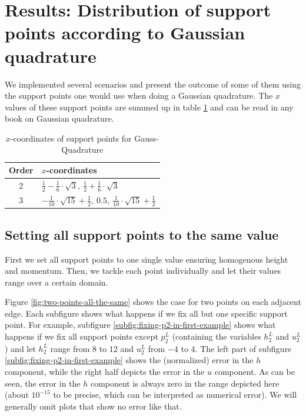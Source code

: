 \documentclass{article}
\begin{document}
\section{Results: Distribution of support points according to Gaussian quadrature}
\label{sec:results}

We implemented several scenarios and present the outcome of some of them using the support points one would use when doing a Gaussian quadrature. The $x$ values of these support points are summed up in table \ref{tab:x-coordinates-gauss-quadrature} and can be read in any book on Gaussian quadrature.

\begin{table}[ht]
  \renewcommand\arraystretch{1.5}
  \centering
  \begin{tabular}[ht]{cl}
    Order & $x$-coordinates \\
    \hline
    2 & $\frac{1}{2}-\frac{1}{6}\cdot \sqrt{3},\  \frac{1}{2}+\frac{1}{6}\cdot \sqrt{3}$ \\
    3 & $-\frac{1}{10}\cdot \sqrt{15}+\frac{1}{2} ,\  0.5,\  \frac{1}{10}\cdot \sqrt{15}+\frac{1}{2}$ \\
    \hline 
  \end{tabular}
  \caption{$x$-coordinates of support points for Gauss-Quadrature}
  \label{tab:x-coordinates-gauss-quadrature}
\end{table}

\subsection{Setting all support points to the same value}
\label{sec:setting-all-support-points-to-the-same-value}

First we set all support points to one single value ensuring homogenous height and momentum. Then, we tackle each point individually and let their values range over a certain domain.



Figure \ref{fig:two-points-all-the-same} shows the case for two points on each adjacent edge. Each subfigure shows what happens if we fix all but one specific support point. For example, subfigure \ref{subfig:fixing-p2-in-first-example} shows what happens if we fix all support points except $p_2^L$ (containing the variables $h_2^L$ and $u_2^L$) and let $h_2^L$ range from 8 to 12 and $u_2^L$ from $-4$ to 4. The left part of subfigure \ref{subfig:fixing-p2-in-first-example} shows the (normalized) error in the $h$ component, while the right half depicts the error in the $u$ component. As can be seen, the error in the $h$ component is always zero in the range depicted here (about $10^{-15}$ to be precise, which can be interpreted as numerical error). We will generally omit plots that show no error like that.
\end{document}
